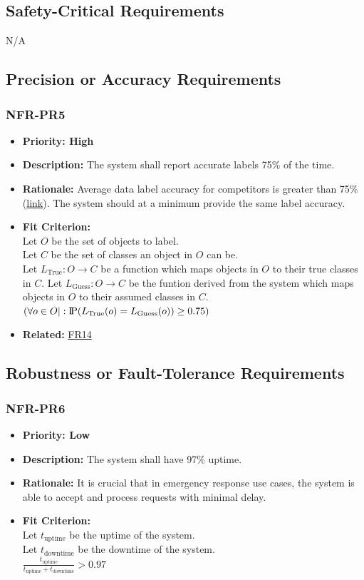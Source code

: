\documentclass[12pt]{article}
\newcommand{\probP}{\text{I\kern-0.15em P}}
\begin{document}
\subsection{Safety-Critical Requirements}
N/A
\subsection{Precision or Accuracy Requirements}
\subsubsection*{NFR-PR5}
\label{sec:PR5}
\begin{itemize}
  \item \textbf{Priority: High}
  \item \textbf{Description:} The system shall report accurate labels 75\% of the time.
  \item \textbf{Rationale:} Average data label accuracy for competitors is greater than 75\% (\href{https://www.researchgate.net/publication/234774537_Data_quality_from_crowdsourcing_A_study_of_annotation_selection_criteria#:~:text=Depending%20on%20the%20number%20of,%5B13%5D%20%5B14%5D%20.}{link}). The system should at a minimum provide the same label accuracy.
  \item \textbf{Fit Criterion:}\\ Let $O$ be the set of objects to label.\\
  Let $C$ be the set of classes an object in $O$ can be.\\
  Let $L_{\text{True}}: O \rightarrow C $ be a function which maps objects in $O$ to their true classes in $C$.
  Let $L_{\text{Guess}}: O \rightarrow C $ be the funtion derived from the system which maps objects in $O$ to their assumed classes in $C$.
  $(\forall o \in O|: \probP(L_{\text{True}}(o) = L_{\text{Guess}}(o))\geq 0.75)$
  \item \textbf{Related:} \hyperref[sec:FR14]{FR14}
\end{itemize}
\subsection{Robustness or Fault-Tolerance Requirements}
\subsubsection*{NFR-PR6}
\label{sec:PR6}
\begin{itemize}
  \item \textbf{Priority: Low}
  \item \textbf{Description:} The system shall have 97\% uptime. 
  \item \textbf{Rationale:} It is crucial that in emergency response use cases, the system is able to accept and process requests with minimal delay.
  \item \textbf{Fit Criterion:}\\ Let $t_{\text{uptime}}$ be the uptime of the system.\\
  Let $t_{\text{downtime}}$ be the downtime of the system.\\
  $\frac{t_{\text{uptime}}}{t_{\text{uptime}} + t_{\text{downtime}}} > 0.97$
\end{itemize}
\end{document}
